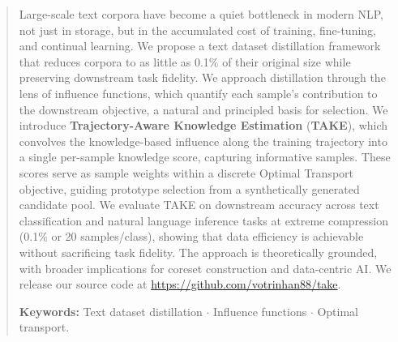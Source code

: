 \begin{abstract} \label{sec:00-abstract}
  Large-scale text corpora have become a quiet bottleneck in modern NLP, not just in storage, but in the accumulated cost of training, fine-tuning, and continual learning.
  We propose a text dataset distillation framework that reduces corpora to as little as 0.1\% of their original size while preserving downstream task fidelity.
  We approach distillation through the lens of influence functions, which quantify each sample's contribution to the downstream objective, a natural and principled basis for selection.
  We introduce \textbf{Trajectory-Aware Knowledge Estimation} (\textbf{TAKE}), which convolves the knowledge-based influence along the training trajectory into a single per-sample knowledge score, capturing informative samples.
  These scores serve as sample weights within a discrete Optimal Transport objective, guiding prototype selection from a synthetically generated candidate pool.
  We evaluate TAKE on downstream accuracy across text classification and natural language inference tasks at extreme compression (0.1\% or 20 samples/class), showing that data efficiency is achievable without sacrificing task fidelity.
  The approach is theoretically grounded, with broader implications for coreset construction and data-centric AI.
  We release our source code at \url{https://github.com/votrinhan88/take}.

  \textbf{Keywords:} Text dataset distillation $\cdot$ Influence functions $\cdot$ Optimal transport.
\end{abstract}
